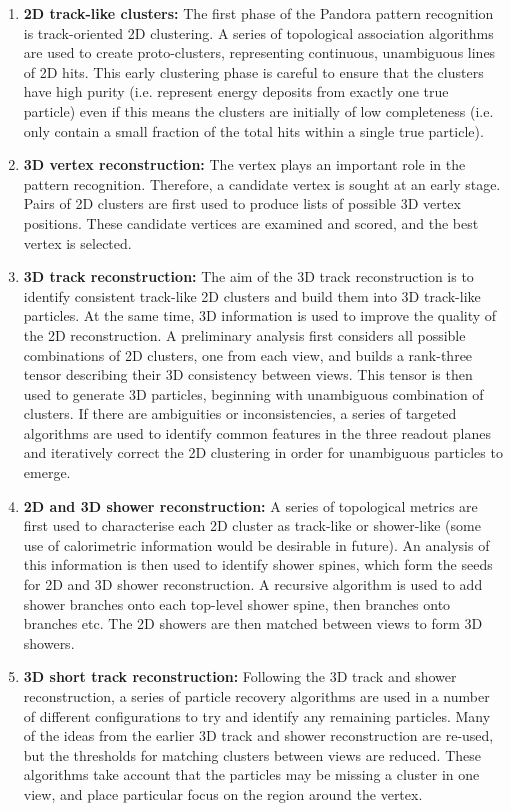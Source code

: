 \begin{enumerate}
\item{\bf 2D track-like clusters:}  The first phase of the Pandora pattern recognition is track-oriented 2D clustering. A series of topological association algorithms are used to create proto-clusters, representing continuous, unambiguous lines of 2D hits. This early clustering phase is careful to ensure that the clusters have high purity (i.e. represent energy deposits from exactly one true particle) even if this means the clusters are initially of low completeness (i.e. only contain a small fraction of the total hits within a single true particle).
\item{\bf 3D vertex reconstruction:} The vertex plays an important role in the pattern recognition. Therefore, a candidate vertex is sought at an early stage. Pairs of 2D clusters are first used to produce lists of possible 3D vertex positions. These candidate vertices are examined and scored, and the best vertex is selected.
\item{\bf 3D track reconstruction:} The aim of the 3D track reconstruction is to identify consistent track-like 2D clusters and build them into 3D track-like particles. At the same time, 3D information is used to improve the quality of the 2D reconstruction. A preliminary analysis first considers all possible combinations of 2D clusters, one from each view, and builds a rank-three tensor describing their 3D consistency between views. This tensor is then used to generate 3D particles, beginning with unambiguous combination of clusters. If there are ambiguities or inconsistencies, a series of targeted algorithms are used to identify common features in the three readout planes and iteratively correct the 2D clustering in order for unambiguous particles to emerge.
\item{\bf 2D and 3D shower reconstruction:} A series of topological metrics are first used to characterise each 2D cluster as track-like or shower-like (some use of calorimetric information would be desirable in future). An analysis of this information is then used to identify shower spines, which form the seeds for 2D and 3D shower reconstruction. A recursive algorithm is used to add shower branches onto each top-level shower spine, then branches onto branches etc. The 2D showers are then matched between views to form 3D showers.
\item{\bf 3D short track reconstruction:} Following the 3D track and shower reconstruction, a series of particle recovery algorithms are used in a number of different configurations to try and identify any remaining particles.  Many of the ideas from the earlier 3D track and shower reconstruction are re-used, but the thresholds for matching clusters between views are reduced. These algorithms take account that the particles may be missing a cluster in one view, and place particular focus on the region around the vertex.

\end{enumerate}

